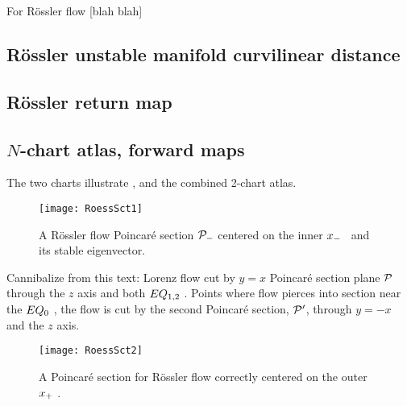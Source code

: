 For R\"ossler flow 
[blah blah]

\subsection{R\"ossler unstable manifold curvilinear distance}
\subsection{R\"ossler return map}
\subsection{$N$-chart atlas, forward maps}

    \ifdraft\color{blue}


The two charts
 illustrate \poincBord,
and  the combined 2-chart atlas.

\begin{figure}%
\begin{center}
  \texttt{[image: RoessSct1]}
\end{center}
  \caption{\label{fig:RoessSct1}
  A R\"ossler flow Poincar\'e section ${\cal P}_{-}$ centered on the inner
  {\eqv} $x_{-}$ \template\ and its stable eigenvector.
}
\end{figure}

Cannibalize from this text:
Lorenz flow cut by  $y=x$ Poincar\'e section plane ${\cal P}$ through the
$z$ axis and both $EQ_{1,2}$ \eqva. Points where flow pierces into
section %
near the $EQ_{0}$ \eqv, the flow is cut by the second Poincar\'e
section,  ${\cal P}'$, through $y=-x$ and the $z$ axis.

\begin{figure}%
\begin{center}
  \texttt{[image: RoessSct2]}
\end{center}
  \caption[R\"ossler section, outer {\eqv}]{
  A Poincar\'e section for R\"ossler flow correctly  centered on the outer
  {\eqv} $x_{+}$ \template.
  } \label{fig:RoessSct2}
\end{figure}

